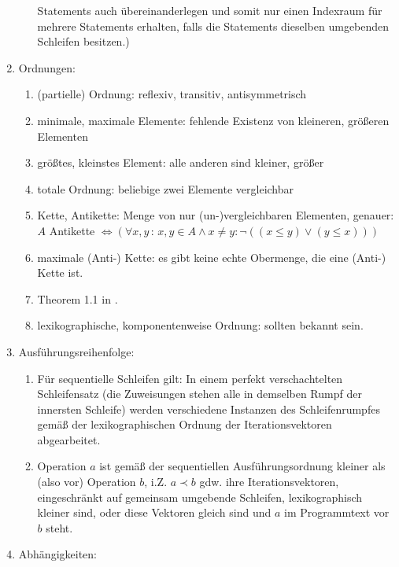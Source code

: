 \begin{enumerate}
\begin{enumerate}
    Statements auch übereinanderlegen und somit nur einen Indexraum für
    mehrere Statements erhalten, falls die Statements dieselben
    umgebenden Schleifen besitzen.)
  \end{enumerate}
\item Ordnungen:
  \begin{enumerate}
  \item (partielle) Ordnung: reflexiv, transitiv, antisymmetrisch
  \item minimale, maximale Elemente: fehlende Existenz von kleineren,
    größeren Elementen
  \item größtes, kleinstes Element: alle anderen sind kleiner, größer
  \item totale Ordnung: beliebige zwei Elemente vergleichbar
  \item Kette, Antikette: Menge von nur (un-)vergleichbaren Elementen,
    genauer: $A$ Antikette $\Leftrightarrow (\forall x,y \, :\, x,y\in A
    \land x\not= y : \neg ((x\leq y) \lor  (y\leq x)))$
  \item maximale (Anti-) Kette: es gibt keine echte Obermenge, die eine
    \hbox{(Anti-)} Kette ist.
  \item Theorem 1.1 in \cite{Ban93}.
  \item lexikographische, komponentenweise Ordnung: sollten bekannt sein.
  \end{enumerate}
\item Ausführungsreihenfolge:
  \begin{enumerate}
  \item Für sequentielle Schleifen gilt: In einem perfekt
    verschachtelten Schleifensatz (die Zuweisungen stehen alle in
    demselben Rumpf der innersten Schleife) werden verschiedene
    Instanzen des Schleifenrumpfes gemäß der lexikographischen Ordnung
    der Iterationsvektoren abgearbeitet.
  \item Operation $a$ ist gemäß der sequentiellen Ausführungsordnung
    kleiner als (also vor) Operation $b$, i.Z. $a \prec b$ gdw. ihre
    Iterationsvektoren, eingeschränkt auf gemeinsam umgebende Schleifen,
    lexikographisch kleiner sind, oder diese Vektoren gleich sind und
    $a$ im Programmtext vor $b$ steht.
  \end{enumerate}
\item Abhängigkeiten:
  \begin{enumerate}

\end{enumerate}
\end{enumerate}
